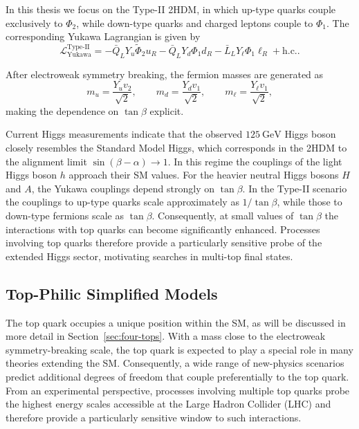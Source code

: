 In this thesis we focus on the Type-II 2HDM, in which up-type quarks
couple exclusively to $\Phi_2$, while down-type quarks and charged
leptons couple to $\Phi_1$.
The corresponding Yukawa Lagrangian is given by
\[
\mathcal{L}_\text{Yukawa}^{\text{Type-II}} =
- \bar{Q}_L Y_u \tilde{\Phi}_2 u_R
- \bar{Q}_L Y_d \Phi_1 d_R
- \bar{L}_L Y_\ell \Phi_1 \ell_R
+ \text{h.c.}.
\]

After electroweak symmetry breaking, the fermion masses are generated as
\[
m_u = \frac{Y_u v_2}{\sqrt{2}}, \qquad
m_d = \frac{Y_d v_1}{\sqrt{2}}, \qquad
m_\ell = \frac{Y_\ell v_1}{\sqrt{2}},
\]
making the dependence on $\tan\beta$ explicit.

Current Higgs measurements indicate that the observed
$125~\mathrm{GeV}$ Higgs boson closely resembles the Standard Model
Higgs, which corresponds in the 2HDM to the alignment limit
$\sin(\beta-\alpha) \to 1$.
In this regime the couplings of the light Higgs boson $h$ approach
their SM values.
For the heavier neutral Higgs bosons $H$ and $A$, the Yukawa
couplings depend strongly on $\tan\beta$.
In the Type-II scenario the couplings to up-type quarks scale
approximately as $1/\tan\beta$, while those to down-type fermions
scale as $\tan\beta$.
Consequently, at small values of $\tan\beta$ the interactions with
top quarks can become significantly enhanced.
Processes involving top quarks therefore provide a particularly
sensitive probe of the extended Higgs sector, motivating searches
in multi-top final states.

\subsection{Top-Philic Simplified Models}\label{subsec:S1/S8}

The top quark occupies a unique position within the SM, 
as will be discussed in more detail in Section~\ref{sec:four-tops}. 
With a mass close to the electroweak symmetry-breaking scale, the top quark 
is expected to play a special role in many theories extending the SM. 
Consequently, a wide range of new-physics scenarios predict additional 
degrees of freedom that couple preferentially to the top quark. 
From an experimental perspective, processes involving multiple top quarks 
probe the highest energy scales accessible at the Large Hadron Collider (LHC) 
and therefore provide a particularly sensitive window to such interactions.

